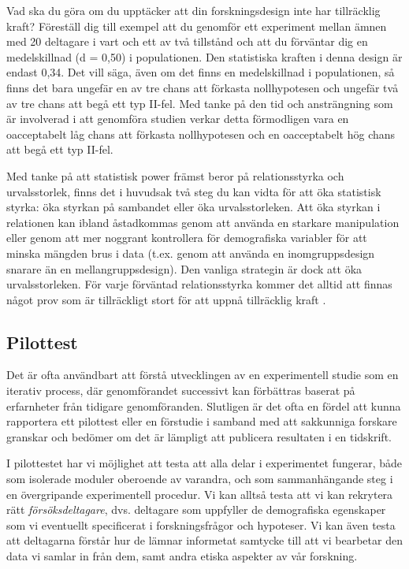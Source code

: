 \documentclass[
]{book}
\begin{document}
Vad ska du göra om du upptäcker att din forskningsdesign inte har tillräcklig kraft? Föreställ dig till exempel att du genomför ett experiment mellan ämnen med 20 deltagare i vart och ett av två tillstånd och att du förväntar dig en medelskillnad (d = 0,50) i populationen. Den statistiska kraften i denna design är endast 0,34. Det vill säga, även om det finns en medelskillnad i populationen, så finns det bara ungefär en av tre chans att förkasta nollhypotesen och ungefär två av tre chans att begå ett typ II-fel. Med tanke på den tid och ansträngning som är involverad i att genomföra studien verkar detta förmodligen vara en oacceptabelt låg chans att förkasta nollhypotesen och en oacceptabelt hög chans att begå ett typ II-fel.

Med tanke på att statistisk power främst beror på relationsstyrka och urvalsstorlek, finns det i huvudsak två steg du kan vidta för att öka statistisk styrka: öka styrkan på sambandet eller öka urvalsstorleken. Att öka styrkan i relationen kan ibland åstadkommas genom att använda en starkare manipulation eller genom att mer noggrant kontrollera för demografiska variabler för att minska mängden brus i data (t.ex. genom att använda en inomgruppsdesign snarare än en mellangruppsdesign). Den vanliga strategin är dock att öka urvalsstorleken. För varje förväntad relationsstyrka kommer det alltid att finnas något prov som är tillräckligt stort för att uppnå tillräcklig kraft \citep{faul2007g, faul2009statistical}.

\hypertarget{sub07.1.3}{%
\subsection{Pilottest}\label{sub07.1.3}}

Det är ofta användbart att förstå utvecklingen av en experimentell studie som en iterativ process, där genomförandet successivt kan förbättras baserat på erfarnheter från tidigare genomföranden. Slutligen är det ofta en fördel att kunna rapportera ett pilottest eller en förstudie i samband med att sakkunniga forskare granskar och bedömer om det är lämpligt att publicera resultaten i en tidskrift.

I pilottestet har vi möjlighet att testa att alla delar i experimentet fungerar, både som isolerade moduler oberoende av varandra, och som sammanhängande steg i en övergripande experimentell procedur. Vi kan alltså testa att vi kan rekrytera rätt \emph{försöksdeltagare}, dvs. deltagare som uppfyller de demografiska egenskaper som vi eventuellt specificerat i forskningsfrågor och hypoteser. Vi kan även testa att deltagarna förstår hur de lämnar informetat samtycke till att vi bearbetar den data vi samlar in från dem, samt andra etiska aspekter av vår forskning.
\end{document}
